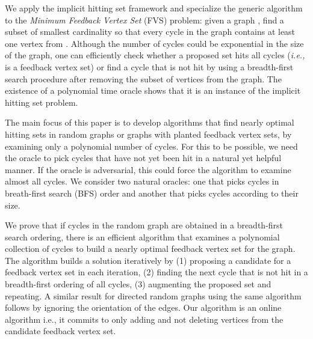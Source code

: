 \documentclass[11pt]{article}
\begin{document}
We apply the implicit hitting set framework and specialize the generic
algorithm to the \emph{Minimum Feedback Vertex Set} (FVS) problem: given a
graph , find a subset  of smallest cardinality so that
every cycle in the graph contains at least one vertex from . Although the
number of cycles could be exponential in the size of the graph, one can
efficiently check whether a proposed set  hits all cycles ({\it i.e.,} is a
feedback vertex set) or find a cycle that is not hit by  using a
breadth-first search procedure after removing the subset of vertices  from
the graph. The existence of a polynomial time oracle shows that it is an
instance of the implicit hitting set problem.

The main focus of this paper is to develop algorithms that find nearly optimal hitting sets in random graphs or graphs with planted feedback vertex sets, by examining only a polynomial number of cycles. For this to be possible, we need the oracle to pick cycles that have not yet been hit in a natural yet helpful manner. If the oracle is adversarial, this could force the algorithm to examine almost all cycles. We consider two natural oracles: one that picks cycles in breath-first search (BFS) order and another that picks cycles according to their size.

We prove that if cycles in the random graph  are obtained in a breadth-first search ordering, there is an efficient algorithm that examines a polynomial collection  of cycles to build a nearly optimal feedback vertex set for the graph. The algorithm builds a solution iteratively by (1) proposing a candidate for a feedback vertex set in each iteration, (2) finding the next cycle that is not hit in a breadth-first ordering of all cycles, (3) augmenting the proposed set and repeating. A similar result for directed random graphs using the same algorithm follows by ignoring the orientation of the edges. Our algorithm is an online algorithm i.e., it commits to only adding and not deleting vertices from the candidate feedback vertex set.
\end{document}
